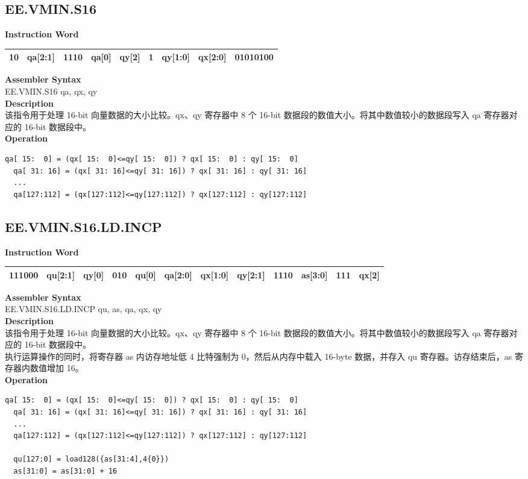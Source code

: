 \clearpage
\subsection{EE.VMIN.S16}\label{instruction:EEVMINS16}
\setlength\tabcolsep{6pt}
\textbf{Instruction Word} \\
\begin{tabular}{|c|c|c|c|c|c|c|c|c|}
	\hline
	10 & qa[2:1] & 1110 & qa[0] & qy[2] & 1 & qy[1:0] & qx[2:0] & 01010100 \\
	\hline
\end{tabular}

\textbf{Assembler Syntax} \\
EE.VMIN.S16 qa, qx, qy \\
\textbf{Description} \\
该指令用于处理 16-bit 向量数据的大小比较。qx、qy 寄存器中 8 个 16-bit 数据段的数值大小。将其中数值较小的数据段写入 qa 寄存器对应的 16-bit 数据段中。\\
\textbf{Operation}
\begin{lstlisting}[escapeinside=`?]
  qa[ 15:  0] = (qx[ 15:  0]<=qy[ 15:  0]) ? qx[ 15:  0] : qy[ 15:  0]
  qa[ 31: 16] = (qx[ 31: 16]<=qy[ 31: 16]) ? qx[ 31: 16] : qy[ 31: 16]
  ...
  qa[127:112] = (qx[127:112]<=qy[127:112]) ? qx[127:112] : qy[127:112]
\end{lstlisting}

\clearpage
\subsection{EE.VMIN.S16.LD.INCP}\label{instruction:EEVMINS16LDINCP}
\setlength\tabcolsep{6pt}
\textbf{Instruction Word} \\
\begin{tabular}{|c|c|c|c|c|c|c|c|c|c|c|c|}
	\hline
	111000 & qu[2:1] & qy[0] & 010 & qu[0] & qa[2:0] & qx[1:0] & qy[2:1] & 1110 & as[3:0] & 111 & qx[2] \\
	\hline
\end{tabular}

\textbf{Assembler Syntax} \\
EE.VMIN.S16.LD.INCP qu, as, qa, qx, qy \\
\textbf{Description} \\
该指令用于处理 16-bit 向量数据的大小比较。qx、qy 寄存器中 8 个 16-bit 数据段的数值大小。将其中数值较小的数据段写入 qa 寄存器对应的 16-bit 数据段中。\\
执行运算操作的同时，将寄存器 as 内访存地址低 4 比特强制为 0，然后从内存中载入 16-byte 数据，并存入 qu 寄存器。访存结束后，as 寄存器内数值增加 16。\\
\textbf{Operation}
\begin{lstlisting}[escapeinside=`?]
  qa[ 15:  0] = (qx[ 15:  0]<=qy[ 15:  0]) ? qx[ 15:  0] : qy[ 15:  0]
  qa[ 31: 16] = (qx[ 31: 16]<=qy[ 31: 16]) ? qx[ 31: 16] : qy[ 31: 16]
  ...
  qa[127:112] = (qx[127:112]<=qy[127:112]) ? qx[127:112] : qy[127:112]

  qu[127:0] = load128({as[31:4],4{0}})
  as[31:0] = as[31:0] + 16
\end{lstlisting}

